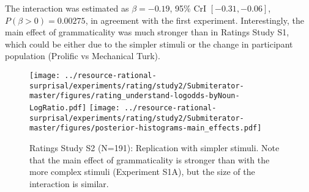 The interaction was estimated as $\beta=-0.19$, 95\% CrI $[-0.31, -0.06]$, $P(\beta>0) = 0.00275$, in agreement with the first experiment.
Interestingly, the main effect of grammaticality was much stronger than in Ratings Study S1, which could be either due to the simpler stimuli or the change in participant population (Prolific vs Mechanical Turk).


\begin{figure}
	\centering
    \texttt{[image: ../resource-rational-surprisal/experiments/rating/study2/Submiterator-master/figures/rating\_understand-logodds-byNoun-LogRatio.pdf]}
	\texttt{[image: ../resource-rational-surprisal/experiments/rating/study2/Submiterator-master/figures/posterior-histograms-main\_effects.pdf]}


	\caption{Ratings Study S2 (N=191): Replication with simpler stimuli. Note that the main effect of grammaticality is stronger than with the more complex stimuli (Experiment S1A), but the size of the interaction is similar.}\label{fig:exp-rating2}
\end{figure}




